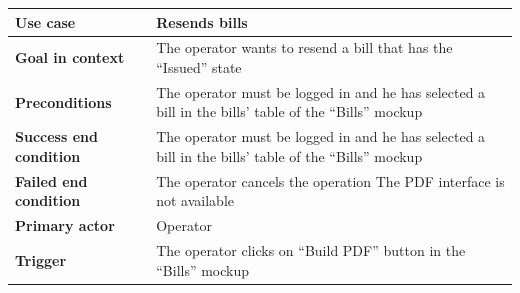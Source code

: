 {{{			\clearpage
	
			\begin{center}
			\begin{tabular}{|p{4cm}|p{10cm}|}
			\hline
				\centering \vspace{1mm} \bfseries{Use case} \vspace{1mm} & 
				\vspace{1mm} Resends bills\vspace{1mm}\\
			\hline
				\centering \vspace{1mm} \bfseries{Goal in context} \vspace{1mm} & 
				\vspace{1mm}The operator wants to resend a bill that has the “Issued” state \vspace{1mm}\\
			\hline
				\centering \vspace{1mm} \bfseries{Preconditions} \vspace{1mm} & 
				\vspace{1mm} The operator must be logged in and he has selected a bill in the bills’ table of the “Bills” mockup\vspace{1mm}\\
			\hline
				\centering \vspace{1mm} \bfseries{Success end condition} \vspace{1mm} & 
				\vspace{1mm}The operator must be logged in and he has selected a bill in the bills’ table of the “Bills” mockup \vspace{1mm}\\
			\hline
				\centering \vspace{1mm} \bfseries{Failed end condition} \vspace{1mm} & 
				\vspace{1mm}The operator cancels the operation The PDF interface is not available \vspace{1mm}\\
			\hline
				\centering \vspace{1mm} \bfseries{Primary actor} \vspace{1mm} & 
				\vspace{1mm} Operator \vspace{1mm}\\
			\hline
				\centering \vspace{1mm} \bfseries{Trigger} \vspace{1mm} & 
				\vspace{1mm} The operator clicks on “Build PDF” button in the “Bills” mockup \vspace{1mm}\\
			\hline
			\end{tabular}


\end{center}}}}
